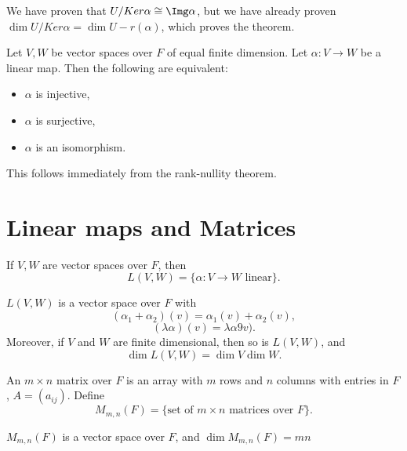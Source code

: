 \documentclass[12pt]{article}
\begin{document}
\begin{proofbox}
	We have proven that $U/Ker \alpha \cong \Img \alpha$, but we have already proven $\dim U/Ker \alpha = \dim U - r(\alpha)$, which proves the theorem.
\end{proofbox}

\begin{lemma}
	Let $V, W$ be vector spaces over $F$ of equal finite dimension. Let $\alpha : V \to W$ be a linear map. Then the following are equivalent:
	\begin{itemize}
		\item $\alpha$ is injective,
		\item $\alpha$ is surjective,
		\item $\alpha$ is an isomorphism.
	\end{itemize}
\end{lemma}

This follows immediately from the rank-nullity theorem.

\newpage

\section{Linear maps and Matrices}%
\label{sec:linear_maps_and_matrices}

\begin{definition}
	If $V, W$ are vector spaces over $F$, then
	\[
		L(V, W) = \{\alpha : V \to W \text{ linear}\}
	.\]
\end{definition}

\begin{proposition}
	$L(V, W)$ is a vector space over $F$ with
	\[
		(\alpha_1 + \alpha_2)(v) = \alpha_1(v) + \alpha_2(v)
	,\]
	\[
		(\lambda \alpha)(v) = \lambda \alpha 9v)
	.\]
	Moreover, if $V$ and $W$ are finite dimensional, then so is $L(V, W)$, and
	\[
		\dim L(V, W) = \dim V \dim W
	.\]
\end{proposition}

\begin{definition}
	An $m \times n$ matrix over $F$ is an array with $m$ rows and $n$ columns with entries in $F$, $A = (a_{ij})$. Define
	\[
		M_{m, n}(F) = \{\text{set of } m \times n \text{ matrices over } F\}
	.\]
\end{definition}

\begin{proposition}
	$M_{m, n}(F)$ is a vector space over $F$, and $\dim M_{m, n}(F) = mn$
\end{proposition}
\end{document}
